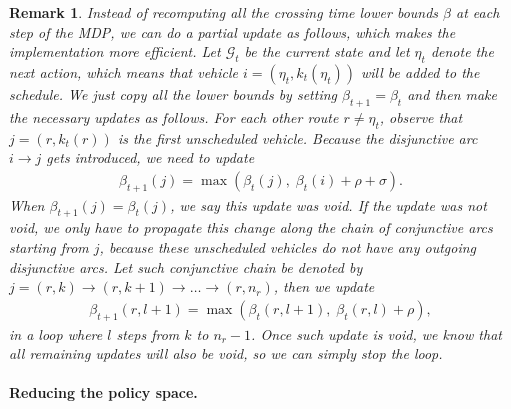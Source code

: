 \documentclass[a4paper]{report}
\theoremstyle{definition}
\theoremstyle{plain}
\newtheorem{remark}{Remark}[chapter]
\begin{document}
\begin{remark}
  Instead of recomputing all the crossing time lower bounds $\beta$ at each step
  of the MDP, we can do a partial update as follows, which makes the
  implementation more efficient.
  Let $\mathcal{G}_t$ be the current state and let $\eta_t$ denote the next
  action, which means that vehicle $i = (\eta_t, k_t(\eta_t))$ will be added to
  the schedule.
  We just copy all the lower bounds by setting $\beta_{t+1} = \beta_t$ and then
  make the necessary updates as follows.
  For each other route $r \neq \eta_t$, observe that $j = (r, k_t(r))$ is the
  first unscheduled vehicle. Because the disjunctive arc $i \rightarrow j$ gets
  introduced, we need to update
  \begin{align*}
    \beta_{t+1}(j) = \max(\beta_t(j), \; \beta_t(i) + \rho + \sigma ) .
  \end{align*}
  When $\beta_{t+1}(j) = \beta_t(j)$, we say this update was void. If the update
  was not void, we only have to propagate this change along the chain of
  conjunctive arcs starting from $j$, because these unscheduled vehicles do not
  have any outgoing disjunctive arcs. Let such conjunctive chain be denoted by
  $j = (r,k) \rightarrow (r,k+1) \rightarrow \dots \rightarrow (r,n_r)$, then we
  update
  \begin{align*}
    \beta_{t+1}(r,l + 1) = \max(\beta_t(r,l + 1) , \; \beta_t(r,l) + \rho) ,
  \end{align*}
  in a loop where $l$ steps from $k$ to $n_r - 1$. Once such update is void, we
  know that all remaining updates will also be void, so we can simply stop the
  loop.
\end{remark}

\clearpage
\paragraph{Reducing the policy space.}
\end{document}
